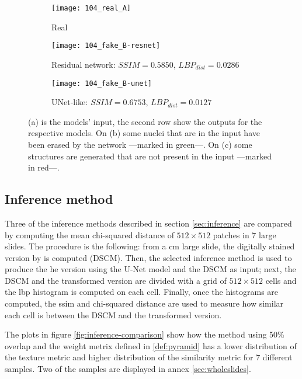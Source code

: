 \documentclass[../main.tex]{subfiles}
\begin{document}
\begin{figure}[H]
\centering
\begin{subfigure}{.5\textwidth}
  \centering
  \texttt{[image: 104\_real\_A]}
  \caption{Real}
  \label{fig:real-example}
\end{subfigure}
\begin{subfigure}{.5\textwidth}
  \centering
  \captionsetup{width=.8\linewidth}
  \texttt{[image: 104\_fake\_B-resnet]}
  \caption{Residual network: $SSIM=0.5850$, $LBP_{dist}=0.0286$}
  \label{fig:resnet-example}
\end{subfigure}%
\begin{subfigure}{.5\textwidth}
  \centering
  \captionsetup{width=.8\linewidth}
  \texttt{[image: 104\_fake\_B-unet]}
  \caption{UNet-like: $SSIM=0.6753$, $LBP_{dist}=0.0127$}
  \label{fig:unet-example}
\end{subfigure}
\caption{(a) is the models' input, the second row show the outputs for the
respective models. On (b) some nuclei that are in the input have been
erased by the network ---marked in green---. On (c) some structures are
generated that are not present in the input ---marked in red---.}
\label{fig:resnet-unet}
\end{figure}

\subsection{Inference method}\label{sec:experiments-inference}
Three of the inference methods described in section \ref{sec:inference} are
compared by
computing the mean chi-squared distance of $512 \times 512$ patches 
in 7 large slides.
The procedure is the following: from a \gls{cm} large slide,
the digitally stained version by \cite{Gareau2009} is computed (DSCM).
Then, the selected inference method
is used to produce the \gls{he} version using the U-Net model and the DSCM
as input; next, the DSCM and the transformed version are divided with a grid of
$512 \times 512$ cells and the
\gls{lbp} histogram is computed on each cell. Finally, once the histograms are
computed, the \gls{ssim} and chi-squared distance are used to measure how similar
each cell is between the DSCM and the transformed version.

The plots in figure \ref{fig:inference-comparison} show how the method using
50\% overlap and the weight metrix defined in \ref{def:pyramid} has a lower
distribution of the texture metric and higher distribution of the similarity
metric for 7 different samples. Two of the samples are displayed in annex
\ref{sec:wholeslides}.
\end{document}
